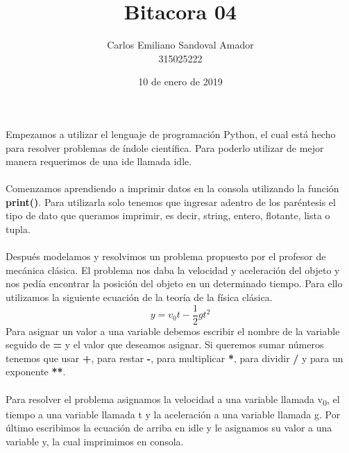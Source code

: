 \documentclass[letterpaper, 12pt, oneside]{article}%
\title{Bitacora 04}
\author{Carlos Emiliano Sandoval Amador \\ 315025222}
\date{10 de enero de 2019}
\begin{document}
	\maketitle
	Empezamos a utilizar el lenguaje de programación Python, el cual está hecho para resolver problemas de índole científica. Para poderlo utilizar de mejor manera requerimos de una ide llamada idle.\\ \\ Comenzamos aprendiendo a imprimir datos en la consola utilizando la función \textbf{print()}. Para utilizarla solo tenemos que ingresar adentro de los paréntesis el tipo de dato que queramos imprimir, es decir, string, entero, flotante, lista o tupla. \\ \\ Después modelamos y resolvimos un problema propuesto por el profesor de mecánica clásica. El problema nos daba la velocidad y aceleración del objeto y nos pedía encontrar la posición del objeto en un determinado tiempo. Para ello utilizamos la siguiente ecuación de la teoría de la física clásica.
	\begin{equation}
		y = v_0t - \frac{1}{2}gt^2
	\end{equation}
	Para asignar un valor a una variable debemos escribir el nombre de la variable seguido de \textbf{=} y el valor que deseamos asignar. Si queremos sumar números tenemos que usar \textbf{+}, para restar \textbf{-}, para multiplicar \textbf{*}, para dividir \textbf{/} y para un exponente \textbf{**}. \\ \\ Para resolver el problema asignamos la velocidad a una variable llamada v\textsubscript{0}, el tiempo a una variable llamada t y la aceleración a una variable llamada g. Por último escribimos la ecuación de arriba en idle y le asignamos su valor a una variable y, la cual imprimimos en consola.
\end{document}
